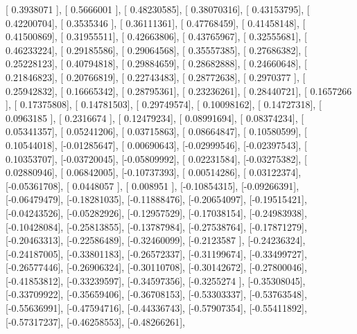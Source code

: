 \documentclass{article}
\begin{document}
       [ 0.3938071 ],
       [ 0.5666001 ],
       [ 0.48230585],
       [ 0.38070316],
       [ 0.43153795],
       [ 0.42200704],
       [ 0.3535346 ],
       [ 0.36111361],
       [ 0.47768459],
       [ 0.41458148],
       [ 0.41500869],
       [ 0.31955511],
       [ 0.42663806],
       [ 0.43765967],
       [ 0.32555681],
       [ 0.46233224],
       [ 0.29185586],
       [ 0.29064568],
       [ 0.35557385],
       [ 0.27686382],
       [ 0.25228123],
       [ 0.40794818],
       [ 0.29884659],
       [ 0.28682888],
       [ 0.24660648],
       [ 0.21846823],
       [ 0.20766819],
       [ 0.22743483],
       [ 0.28772638],
       [ 0.2970377 ],
       [ 0.25942832],
       [ 0.16665342],
       [ 0.28795361],
       [ 0.23236261],
       [ 0.28440721],
       [ 0.1657266 ],
       [ 0.17375808],
       [ 0.14781503],
       [ 0.29749574],
       [ 0.10098162],
       [ 0.14727318],
       [ 0.0963185 ],
       [ 0.2316674 ],
       [ 0.12479234],
       [ 0.08991694],
       [ 0.08374234],
       [ 0.05341357],
       [ 0.05241206],
       [ 0.03715863],
       [ 0.08664847],
       [ 0.10580599],
       [ 0.10544018],
       [-0.01285647],
       [ 0.00690643],
       [-0.02999546],
       [-0.02397543],
       [ 0.10353707],
       [-0.03720045],
       [-0.05809992],
       [ 0.02231584],
       [-0.03275382],
       [ 0.02880946],
       [ 0.06842005],
       [-0.10737393],
       [ 0.00514286],
       [ 0.03122374],
       [-0.05361708],
       [ 0.0448057 ],
       [ 0.008951  ],
       [-0.10854315],
       [-0.09266391],
       [-0.06479479],
       [-0.18281035],
       [-0.11888476],
       [-0.20654097],
       [-0.19515421],
       [-0.04243526],
       [-0.05282926],
       [-0.12957529],
       [-0.17038154],
       [-0.24983938],
       [-0.10428084],
       [-0.25813855],
       [-0.13787984],
       [-0.27538764],
       [-0.17871279],
       [-0.20463313],
       [-0.22586489],
       [-0.32460099],
       [-0.2123587 ],
       [-0.24236324],
       [-0.24187005],
       [-0.33801183],
       [-0.26572337],
       [-0.31199674],
       [-0.33499727],
       [-0.26577446],
       [-0.26906324],
       [-0.30110708],
       [-0.30142672],
       [-0.27800046],
       [-0.41853812],
       [-0.33239597],
       [-0.34597356],
       [-0.3255274 ],
       [-0.35308045],
       [-0.33709922],
       [-0.35659406],
       [-0.36708153],
       [-0.53303337],
       [-0.53763548],
       [-0.55636991],
       [-0.47594716],
       [-0.44336743],
       [-0.57907354],
       [-0.55411892],
       [-0.57317237],
       [-0.46258553],
       [-0.48266261],
\end{document}
